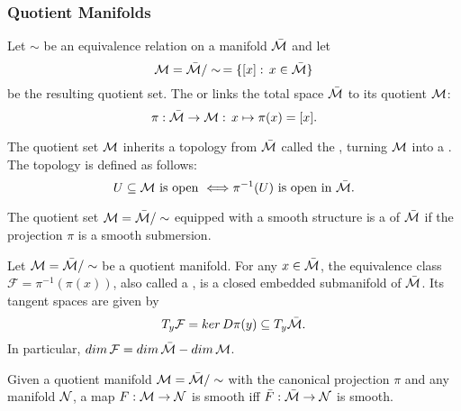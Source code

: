 \documentclass[11pt,a4paper]{article}
\begin{document}
\subsubsection{Quotient Manifolds}

Let $\sim$ be an equivalence relation on a manifold $\bar{\mathcal{M}}$ and let 
\begin{equation*}
\mathcal{M} = \bar{\mathcal{M}}/\sim \,= \{[x]:\,x\in \bar{\mathcal{M}}\}
\end{equation*}
be the resulting quotient set. The  or  links the total space $\bar{\mathcal{M}}$ to its quotient $\mathcal{M}$:
\begin{equation*}
    \pi:\bar{\mathcal{M}}\rightarrow \mathcal{M}:\,x\mapsto \pi(x) = [x].
\end{equation*}

\begin{mydef}
The quotient set $\mathcal{M}$ inherits a topology from $\bar{\mathcal{M}}$ called the , turning $\mathcal{M}$ into a . The topology is defined as follows:
\begin{equation*}
U\subseteq \mathcal{M} \text{ is open } \Longleftrightarrow \pi^{-1}(U)\text{ is open in }\bar{\mathcal{M}}.
\end{equation*}
\end{mydef}

\begin{mydef}
The quotient set $\mathcal{M} = \bar{\mathcal{M}}/\sim$ equipped with a smooth structure is a  of $\bar{\mathcal{M}}$ if the projection $\pi$ is a smooth submersion.
\end{mydef}

\begin{prop}
Let $\mathcal{M} = \bar{\mathcal{M}}/\sim$ be a quotient manifold. For any $x\in \bar{\mathcal{M}}$, the equivalence class $\mathcal{F} = \pi^{-1}(\pi(x))$, also called a , is a closed embedded submanifold of $\bar{\mathcal{M}}$. Its tangent spaces are given by
\begin{equation*}
T_y\mathcal{F} = ker\,D\pi(y)\subseteq T_y\bar{\mathcal{M}}.
\end{equation*}
In particular, $dim\,\mathcal{F} = dim\,\bar{\mathcal{M}}-dim\,\mathcal{M}$.
\end{prop}

\begin{prop}
Given a quotient manifold $\mathcal{M} = \bar{\mathcal{M}}/\sim$ with the canonical projection $\pi$ and any manifold $\mathcal{N}$, a map $F:\mathcal{M}\rightarrow \mathcal{N}$ is smooth iff $\bar{F}:\bar{\mathcal{M}}\rightarrow \mathcal{N}$ is smooth.
\end{prop}
\end{document}
